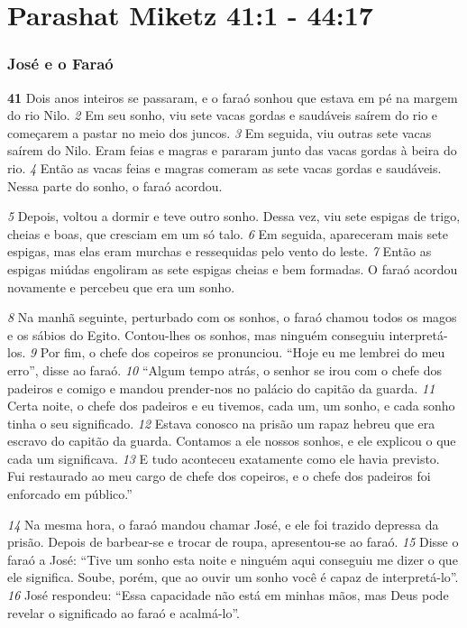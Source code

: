 \section*{Parashat Miketz 41:1 - 44:17}

   
\subsubsection*{José e o Faraó}

\textbf{\large 41}
 Dois anos inteiros se passaram, e o faraó sonhou que estava em pé na
margem do rio Nilo. 
\textit{\tiny 2} 
Em seu sonho, viu sete vacas gordas e saudáveis saírem do
rio e começarem a pastar no meio dos juncos. 
\textit{\tiny 3} 
Em seguida, viu outras sete vacas
saírem do Nilo. Eram feias e magras e pararam junto das vacas gordas à beira do
rio. 
\textit{\tiny 4} 
Então as vacas feias e magras comeram as sete vacas gordas e saudáveis.
Nessa parte do sonho, o faraó acordou. 

\bigskip   
\textit{\tiny 5}
Depois, voltou a dormir e teve outro sonho. Dessa vez, viu sete espigas de trigo,
cheias e boas, que cresciam em um só talo. 
\textit{\tiny 6} 
Em seguida, apareceram mais sete
espigas, mas elas eram murchas e ressequidas pelo vento do leste. 
\textit{\tiny 7} 
Então as
espigas miúdas engoliram as sete espigas cheias e bem formadas. O faraó acordou
novamente e percebeu que era um sonho.
 
\bigskip   
\textit{\tiny 8}
Na manhã seguinte, perturbado com os sonhos, o faraó chamou todos os
magos e os sábios do Egito. Contou-lhes os sonhos, mas ninguém conseguiu
interpretá-los. 
\textit{\tiny 9}
Por fim, o chefe dos copeiros se pronunciou. “Hoje eu me lembrei do meu
erro”, disse ao faraó. 
\textit{\tiny 10}
“Algum tempo atrás, o senhor se irou com o chefe dos
padeiros e comigo e mandou prender-nos no palácio do capitão da guarda.
\textit{\tiny 11}
Certa noite, o chefe dos padeiros e eu tivemos, cada um, um sonho, e cada
sonho tinha o seu significado. 
\textit{\tiny 12}
Estava conosco na prisão um rapaz hebreu que
era escravo do capitão da guarda. Contamos a ele nossos sonhos, e ele explicou o
que cada um significava. 
\textit{\tiny 13}
E tudo aconteceu exatamente como ele havia previsto.
Fui restaurado ao meu cargo de chefe dos copeiros, e o chefe dos padeiros foi
enforcado em público.”

\bigskip   
\textit{\tiny 14}
Na mesma hora, o faraó mandou chamar José, e ele foi trazido depressa da
prisão. Depois de barbear-se e trocar de roupa, apresentou-se ao faraó. 
\textit{\tiny 15}
Disse o
faraó a José: “Tive um sonho esta noite e ninguém aqui conseguiu me dizer o que
ele significa. Soube, porém, que ao ouvir um sonho você é capaz de interpretá-lo”.
\textit{\tiny 16}
José respondeu: “Essa capacidade não está em minhas mãos, mas Deus pode
revelar o significado ao faraó e acalmá-lo”.

